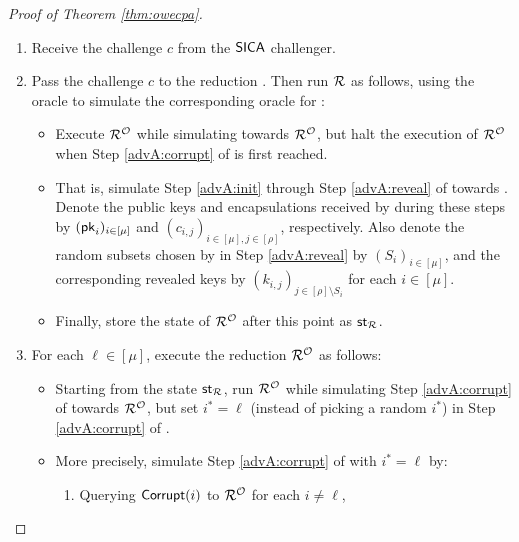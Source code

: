 \begin{proof}[Proof of Theorem \ref{thm:owecpa}]
  \begin{enumerate}[itemsep=0.1cm]
    \item Receive the challenge \(c\) from the \(\mathsf{SICA}\) challenger.
    \item Pass the challenge \(c\) to the reduction \redR. Then run \(\redR\) as follows,
          using the oracle \oracle to simulate the corresponding oracle for \redR:
          \begin{itemize}[label={\textbullet},itemsep=0.1cm]
            \item Execute \(\redR^{\oracle}\) while simulating \advA towards \(\redR^{\oracle}\),
                  but halt the execution of \(\redR^{\oracle}\)
                  when Step \ref{advA:corrupt} of \advA is first reached.
            \item That is, simulate Step \ref{advA:init} through Step \ref{advA:reveal} of \advA towards \redR.
                  Denote the public keys and encapsulations
                  received by \advA during these steps by \((\mathsf{pk}_{i})_{i \in [\mu]}\) and
                  \((c_{i,j})_{i \in [\mu], j \in [\rho]}\), respectively.
                  Also denote the random subsets chosen by \advA in Step \ref{advA:reveal}
                  by \((S_{i})_{i \in [\mu]}\),
                  and the corresponding revealed keys by \((k_{i,j})_{j \in [\rho] \setminus S_{i}}\)
                  for each \(i \in [\mu]\).
            \item Finally, store the state of \(\redR^{\oracle}\) after this point as \(\state_{\redR}\).
          \end{itemize}
    \item\label{advM:rewind}
          For each \(\ell \in [\mu]\), execute the reduction \(\redR^{\oracle}\) as follows:
          \begin{itemize}[label={\textbullet},itemsep=0.1cm]
            \item Starting from the state \(\state_{\redR}\),
                  run \(\redR^{\oracle}\) while simulating Step
                  \ref{advA:corrupt} of \advA towards \(\redR^{\oracle}\),
                  but set \(i^{*} = \ell\) (instead of picking a random \(i^{*}\))
                  in Step \ref{advA:corrupt} of \advA.
            \item More precisely, simulate Step \ref{advA:corrupt} of \advA with \(i^{*} = \ell\) by:
                  \begin{enumerate}[topsep=0.1cm,itemsep=0.1cm,ref=(\alph*)]
                    \item Querying \(\mathsf{Corrupt}(i)\) to \(\redR^{\oracle}\) for each \(i \ne \ell\),

\end{enumerate}
\end{itemize}
\end{enumerate}
\end{proof}
